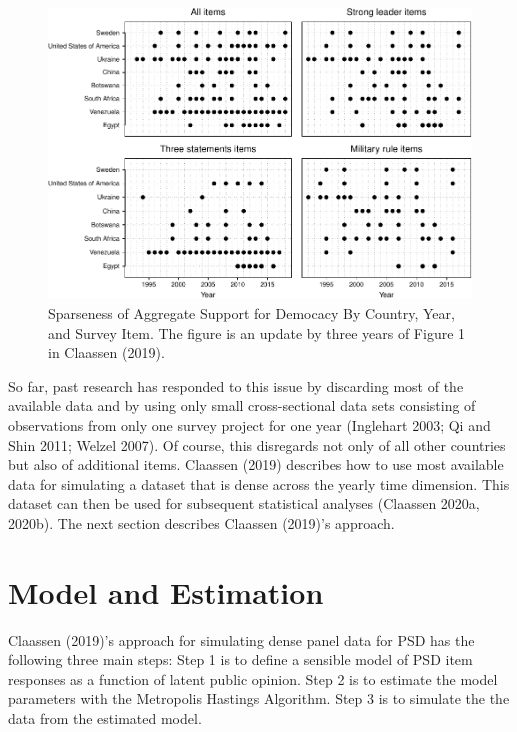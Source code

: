 \documentclass[12pt,english,a4paper,oneside]{article}
\theoremstyle{definition}
\theoremstyle{definition}
\theoremstyle{definition}
\theoremstyle{definition}
\theoremstyle{remark}
\begin{document}
\begin{figure}[H]
\includegraphics[width=\textwidth]{figs/sparse-data-1} \caption[Sparseness of Aggregate Support for Democacy By Country, Year, and Survey Item]{Sparseness of Aggregate Support for Democacy By Country, Year, and Survey Item. The figure is an update by three years of Figure 1 in Claassen (2019).}\label{fig:sparse-data}
\end{figure}

\noindent
So far, past research has responded to this issue by discarding most of the available data and by using only small cross-sectional data sets consisting of observations from only one survey project for one year (Inglehart 2003; Qi and Shin 2011; Welzel 2007). Of course, this disregards not only of all other countries but also of additional items. Claassen (2019) describes how to use most available data for simulating a dataset that is dense across the yearly time dimension. This dataset can then be used for subsequent statistical analyses (Claassen 2020a, 2020b). The next section describes Claassen (2019)'s approach.

\hypertarget{model-and-estimation}{%
\section{Model and Estimation}\label{model-and-estimation}}

Claassen (2019)'s approach for simulating dense panel data for PSD has the following three main steps: Step 1 is to define a sensible model of PSD item responses as a function of latent public opinion. Step 2 is to estimate the model parameters with the Metropolis Hastings Algorithm. Step 3 is to simulate the the data from the estimated model.
\end{document}
